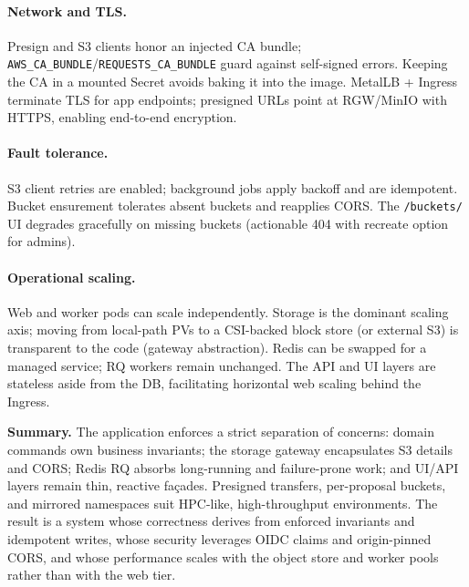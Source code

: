 \paragraph{Network and TLS.}
Presign and S3 clients honor an injected CA bundle; \texttt{AWS\_CA\_BUNDLE}/\texttt{REQUESTS\_CA\_BUNDLE} guard against self-signed errors. Keeping the CA in a mounted Secret avoids baking it into the image. MetalLB + Ingress terminate TLS for app endpoints; presigned URLs point at RGW/MinIO with HTTPS, enabling end-to-end encryption.

\paragraph{Fault tolerance.}
S3 client retries are enabled; background jobs apply backoff and are idempotent. Bucket ensurement tolerates absent buckets and reapplies CORS. The \texttt{/buckets/} UI degrades gracefully on missing buckets (actionable 404 with recreate option for admins).

\paragraph{Operational scaling.}
Web and worker pods can scale independently. Storage is the dominant scaling axis; moving from local-path PVs to a CSI-backed block store (or external S3) is transparent to the code (gateway abstraction). Redis can be swapped for a managed service; RQ workers remain unchanged. The API and UI layers are stateless aside from the DB, facilitating horizontal web scaling behind the Ingress.

\bigskip

\noindent\textbf{Summary.}
The application enforces a strict separation of concerns: domain commands own business invariants; the storage gateway encapsulates S3 details and CORS; Redis RQ absorbs long-running and failure-prone work; and UI/API layers remain thin, reactive façades. Presigned transfers, per-proposal buckets, and mirrored namespaces suit HPC-like, high-throughput environments. The result is a system whose correctness derives from enforced invariants and idempotent writes, whose security leverages OIDC claims and origin-pinned CORS, and whose performance scales with the object store and worker pools rather than with the web tier.